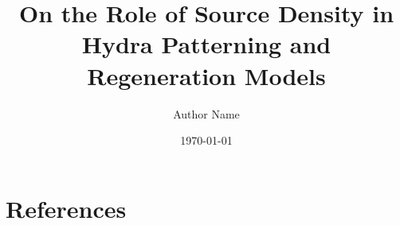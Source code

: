 \documentclass[11pt]{amsart}
\title{On the Role of Source Density in Hydra Patterning and Regeneration Models}
\author{Author Name}
\date{\today}
\begin{document}


\maketitle










\section*{References}

% 
% 
\end{document}
